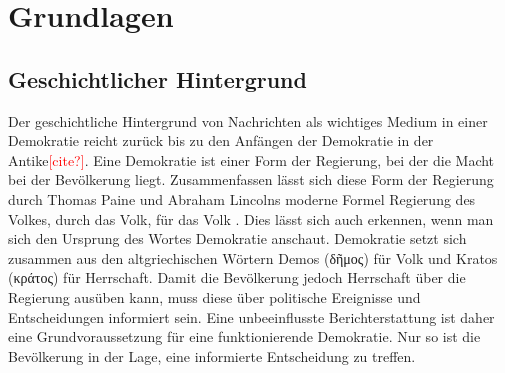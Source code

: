 \section{Grundlagen}

\subsection{Geschichtlicher Hintergrund}\label{sec:story-background}
Der geschichtliche Hintergrund von Nachrichten als wichtiges Medium in einer Demokratie reicht zurück bis zu den Anfängen der Demokratie in der Antike\textcolor{red}{[cite?]}.
Eine Demokratie ist einer Form der Regierung, bei der die Macht bei der Bevölkerung liegt.
Zusammenfassen lässt sich diese Form der Regierung durch Thomas Paine und Abraham Lincolns moderne Formel \glqq Regierung des Volkes, durch das Volk, für das Volk\grqq{} \cite{lincoln}.
Dies lässt sich auch erkennen, wenn man sich den Ursprung des Wortes Demokratie anschaut.
Demokratie setzt sich zusammen aus den altgriechischen Wörtern Demos (\textgreek{δῆμος}) für Volk und Kratos (\textgreek{κράτος}) für Herrschaft.
Damit die Bevölkerung jedoch Herrschaft über die Regierung ausüben kann, muss diese über politische Ereignisse und Entscheidungen informiert sein.
Eine unbeeinflusste Berichterstattung ist daher eine Grundvoraussetzung für eine funktionierende Demokratie.
Nur so ist die Bevölkerung in der Lage, eine informierte Entscheidung zu treffen. \\

